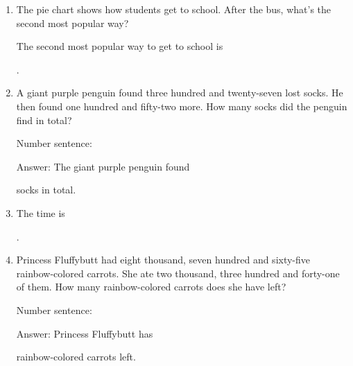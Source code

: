 \documentclass{tufte-book}
\begin{document}
\begin{enumerate}
\item {}
The pie chart shows how students get to school. After the bus, what's the second most popular way?\medskip

The second most popular way to get to school is \dotfill\medskip\par\dotfill\medskip.

\item A giant purple penguin found three hundred and twenty-seven lost socks. He then found one hundred and fifty-two more. How many socks did the penguin find in total?\medskip\par
Number sentence: \dotfill\medskip\par
Answer: The giant purple penguin found 
\dotfill\medskip\par\mbox{}\dotfill\medskip\par\mbox{}\dotfill\bigskip
 socks in total.
\item {}
The time is \dotfill\medskip\par\dotfill\medskip.

\item Princess Fluffybutt had eight thousand, seven hundred and sixty-five rainbow-colored carrots. She ate two thousand, three hundred and forty-one of them. How many rainbow-colored carrots does she have left?\medskip\par
Number sentence: \dotfill\medskip\par
Answer: Princess Fluffybutt has 
\dotfill\medskip\par\mbox{}\dotfill\medskip\par\mbox{}\dotfill\bigskip
 rainbow-colored carrots left.
\end{enumerate}
\end{document}
